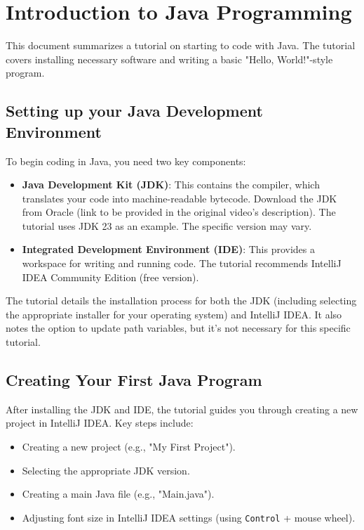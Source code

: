 \documentclass{article}
\begin{document}
\section{Introduction to Java Programming}

This document summarizes a tutorial on starting to code with Java.  The tutorial covers installing necessary software and writing a basic "Hello, World!"-style program.

\subsection{Setting up your Java Development Environment}

To begin coding in Java, you need two key components:

\begin{itemize}
    \item \textbf{Java Development Kit (JDK)}: This contains the compiler, which translates your code into machine-readable bytecode. Download the JDK from Oracle (link to be provided in the original video's description). The tutorial uses JDK 23 as an example.  The specific version may vary.
    \item \textbf{Integrated Development Environment (IDE)}:  This provides a workspace for writing and running code. The tutorial recommends IntelliJ IDEA Community Edition (free version).
\end{itemize}

The tutorial details the installation process for both the JDK (including selecting the appropriate installer for your operating system) and IntelliJ IDEA.  It also notes the option to update path variables, but it's not necessary for this specific tutorial.


\subsection{Creating Your First Java Program}

After installing the JDK and IDE, the tutorial guides you through creating a new project in IntelliJ IDEA. Key steps include:

\begin{itemize}
    \item Creating a new project (e.g., "My First Project").
    \item Selecting the appropriate JDK version.
    \item Creating a main Java file (e.g., "Main.java").
    \item Adjusting font size in IntelliJ IDEA settings (using \texttt{Control} + mouse wheel).
\end{itemize}
\end{document}
